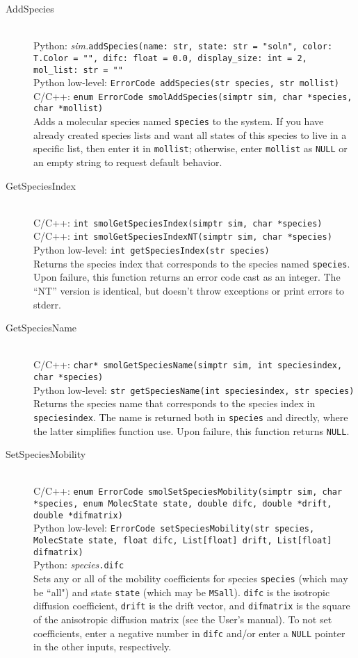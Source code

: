 \documentclass {book}
\newcommand {\ttt} {\texttt}
\begin{document}
\begin{description}

\item[AddSpecies]
\hfill \\
Python: \textit{sim.}\ttt{addSpecies(name: str, state: str = "soln", color: T.Color = "", difc: float = 0.0, display\_size: int = 2, mol\_list: str = ""}\\
Python low-level: \ttt{ErrorCode addSpecies(str species, str mollist)}\\
C/C++: \ttt{enum ErrorCode smolAddSpecies(simptr sim, char *species, char *mollist)}\\
Adds a molecular species named \ttt{species} to the system. If you have already created species lists and want all states of this species to live in a specific list, then enter it in \ttt{mollist}; otherwise, enter \ttt{mollist} as \ttt{NULL} or an empty string to request default behavior.

\item[GetSpeciesIndex]
\hfill \\
C/C++: \ttt{int smolGetSpeciesIndex(simptr sim, char *species)}\\
C/C++: \ttt{int smolGetSpeciesIndexNT(simptr sim, char *species)}\\
Python low-level: \ttt{int getSpeciesIndex(str species)}\\
Returns the species index that corresponds to the species named \ttt{species}. Upon failure, this function returns an error code cast as an integer. The ``NT'' version is identical, but doesn't throw exceptions or print errors to stderr.

\item[GetSpeciesName]
\hfill \\
C/C++: \ttt{char* smolGetSpeciesName(simptr sim, int speciesindex, char *species)}\\
Python low-level: \ttt{str getSpeciesName(int speciesindex, str species)}\\
Returns the species name that corresponds to the species index in \ttt{speciesindex}. The name is returned both in \ttt{species} and directly, where the latter simplifies function use. Upon failure, this function returns \ttt{NULL}.

\item[SetSpeciesMobility]
\hfill \\
C/C++: \ttt{enum ErrorCode smolSetSpeciesMobility(simptr sim, char *species, enum MolecState state, double difc, double *drift, double *difmatrix)}\\
Python low-level: \ttt{ErrorCode setSpeciesMobility(str species, MolecState state, float difc, List[float] drift, List[float] difmatrix)}\\
Python: \textit{species}\ttt{.difc}\\
Sets any or all of the mobility coefficients for species \ttt{species} (which may be ``all") and state \ttt{state} (which may be \ttt{MSall}). \ttt{difc} is the isotropic diffusion coefficient, \ttt{drift} is the drift vector, and \ttt{difmatrix} is the square of the anisotropic diffusion matrix (see the User's manual). To not set coefficients, enter a negative number in \ttt{difc} and/or enter a \ttt{NULL} pointer in the other inputs, respectively.


\end{description}
\end{document}
